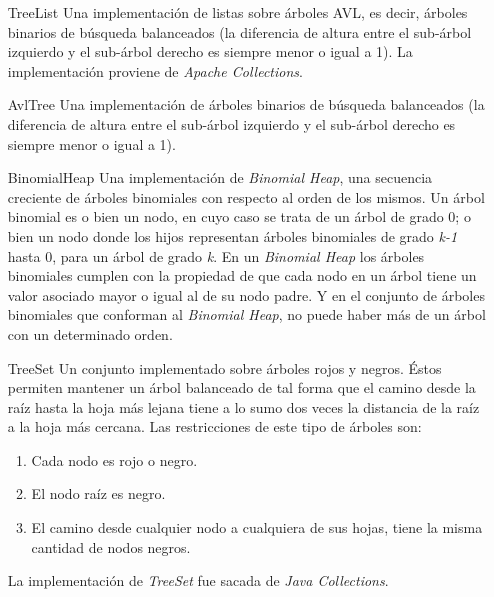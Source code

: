\begin{enumerate}[leftmargin=.75cm,align=left,style=nextline]
	\item[TreeList] Una implementaci\'on de listas sobre \'arboles AVL, es decir, \'arboles binarios de b\'usqueda balanceados (la diferencia de altura entre el sub-\'arbol izquierdo y el sub-\'arbol derecho es siempre menor o igual a 1). La implementaci\'on proviene de \emph{Apache Collections}.
	
	\item[AvlTree] Una implementaci\'on de \'arboles binarios de b\'usqueda balanceados (la diferencia de altura entre el sub-\'arbol izquierdo y el sub-\'arbol derecho es siempre menor o igual a 1).
	
	\item[BinomialHeap] Una implementaci\'on de \emph{Binomial Heap}, una secuencia creciente de \'arboles binomiales con respecto al orden de los mismos. Un \'arbol binomial es o bien un nodo, en cuyo caso se trata de un \'arbol de grado 0; o bien un nodo donde los hijos representan \'arboles binomiales de grado \emph{k-1} hasta 0, para un \'arbol de grado \emph{k}. En un \emph{Binomial Heap} los \'arboles binomiales cumplen con la propiedad de que cada nodo en un \'arbol tiene un valor asociado mayor o igual al de su nodo padre. Y en el conjunto de \'arboles binomiales que conforman al \emph{Binomial Heap}, no puede haber m\'as de un \'arbol con un determinado orden.
	
	\item[TreeSet] Un conjunto implementado sobre \'arboles rojos y negros. \'Estos permiten mantener un \'arbol balanceado de tal forma que el camino desde la ra\'iz hasta la hoja m\'as lejana tiene a lo sumo dos veces la distancia de la ra\'iz a la hoja m\'as cercana. Las restricciones de este tipo de \'arboles son:
	\begin{enumerate}
		\item Cada nodo es rojo o negro.
		\item El nodo ra\'iz es negro.
		\item El camino desde cualquier nodo a cualquiera de sus hojas, tiene la misma cantidad de nodos negros.
	\end{enumerate}
	La implementaci\'on de \emph{TreeSet} fue sacada de \emph{Java Collections}. %
	

\end{enumerate}
